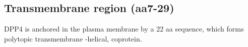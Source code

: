 \subsection{Transmembrane region (aa7-29)}

DPP4 is anchored in the plasma membrane by a 22 aa sequence, which forms polytopic transmembrane \alpha-helical, coprotein. \cite{Hong_1990}